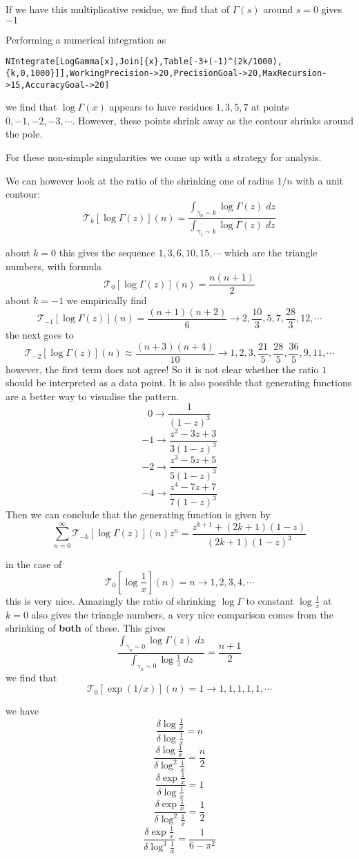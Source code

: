 \documentclass{article}
\begin{document}
If we have this multiplicative residue, we find that of $\Gamma(s)$ around $s=0$ gives $-1$


Performing a numerical integration as 
\begin{verbatim}
NIntegrate[LogGamma[x],Join[{x},Table[-3+(-1)^(2k/1000),{k,0,1000}]],WorkingPrecision->20,PrecisionGoal->20,MaxRecursion->15,AccuracyGoal->20]
\end{verbatim}
we find that $\log \Gamma(x)$ appears to have residues $1,3,5,7$ at points $0,-1,-2,-3,\cdots$.
However, these points shrink away as the contour shrinks around the pole.


For these non-simple singularities we come up with a strategy for analysis.

We can however look at the ratio of the shrinking one of radius $1/n$ with a unit contour:
$$
\mathcal{T}_k[\log \Gamma(z)](n) = \frac{\int_{\gamma_n \sim k} \log\Gamma(z) \; dz}{\int_{\gamma_1 \sim k} \log\Gamma(z) \; dz}
$$

about $k=0$ this gives the sequence $1,3,6,10,15,\cdots$ which are the triangle numbers, with formula
$$
\mathcal{T}_0[\log \Gamma(z)](n) = \frac{n(n+1)}{2}
$$
about $k=-1$ we empirically find 
$$
\mathcal{T}_{-1}[\log \Gamma(z)](n) = \frac{(n+1)(n+2)}{6} \to 2, \frac{10}{3}, 5, 7, \frac{28}{3}, 12, \cdots
$$
the next goes to 
$$
\mathcal{T}_{-2}[\log \Gamma(z)](n) \approx \frac{(n+3)(n+4)}{10} \to 1, 2,3,\frac{21}{5},\frac{28}{5},\frac{36}{5},9,11, \cdots
$$
however, the first term does not agree! So it is not clear whether the ratio $1$ should be interpreted as a data point. It is also possible that generating functions are a better way to visualise the pattern.
$$
0 \to \frac{1}{(1-z)^3}
$$
$$
-1 \to \frac{z^2-3z+3}{3(1-z)^3}
$$
$$
-2 \to \frac{z^3-5z+5}{5(1-z)^3}
$$
$$
-4 \to \frac{z^4-7z+7}{7(1-z)^3}
$$
Then we can conclude that the generating function is given by 
$$
\sum_{n=0}^\infty \mathcal{T}_{-k}[\log \Gamma(z)](n) z^n = \frac{z^{k+1} + (2k+1)(1-z)}{(2k+1)(1-z)^3}
$$

in the case of 
$$
\mathcal{T}_{0}[\log \frac{1}{x}](n) = n \to 1,2,3,4,\cdots
$$
this is very nice. Amazingly the ratio of shrinking $\log \Gamma$ to constant $\log \frac{1}{x}$ at $k=0$ also gives the triangle numbers, a very nice comparison comes from the shrinking of \textbf{both} of these. This gives
$$
\frac{\int_{\gamma_n \sim 0} \log\Gamma(z) \; dz}{\int_{\gamma_n \sim 0} \log\frac{1}{z} \; dz} = \frac{n+1}{2}
$$
we find that
$$
\mathcal{T}_{0}[\exp(1/x)](n) = 1 \to 1,1,1,1,1,\cdots
$$

we have 
$$
\frac{\delta \log \frac{1}{x} }{\delta \log \frac{1}{x}} = n
$$
$$
\frac{\delta \log \frac{1}{x} }{\delta \log^2 \frac{1}{x}} = \frac{n}{2}
$$
$$
\frac{\delta \exp \frac{1}{x} }{\delta \log \frac{1}{x}} = 1
$$
$$
\frac{\delta \exp \frac{1}{x} }{\delta \log^2 \frac{1}{x}} = \frac{1}{2}
$$
$$
\frac{\delta \exp \frac{1}{x} }{\delta \log^3 \frac{1}{x}} = \frac{1}{6-\pi^2}
$$
\end{document}
